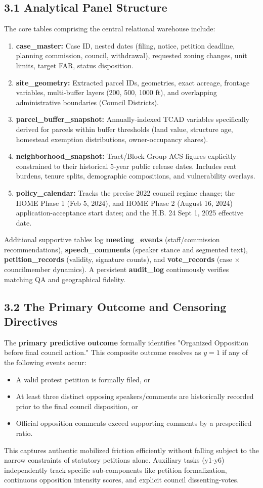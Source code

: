 \subsection*{3.1 Analytical Panel Structure}
The core tables comprising the central relational warehouse include:
\begin{enumerate}
 \item \textbf{case\_master:} Case ID, nested dates (filing, notice, petition deadline, planning commission, council, withdrawal), requested zoning changes, unit limits, target FAR, status disposition.
 \item \textbf{site\_geometry:} Extracted parcel IDs, geometries, exact acreage, frontage variables, multi-buffer layers (200, 500, 1000 ft), and overlapping administrative boundaries (Council Districts).
 \item \textbf{parcel\_buffer\_snapshot:} Annually-indexed TCAD variables specifically derived for parcels within buffer thresholds (land value, structure age, homestead exemption distributions, owner-occupancy shares).
 \item \textbf{neighborhood\_snapshot:} Tract/Block Group ACS figures explicitly constrained to their historical 5-year public release dates. Includes rent burdens, tenure splits, demographic compositions, and vulnerability overlays.
 \item \textbf{policy\_calendar:} Tracks the precise 2022 council regime change; the HOME Phase 1 (Feb 5, 2024), and HOME Phase 2 (August 16, 2024) application-acceptance start dates; and the H.B. 24 Sept 1, 2025 effective date.
\end{enumerate}

Additional supportive tables log \textbf{meeting\_events} (staff/commission recommendations), \textbf{speech\_comments} (speaker stance and segmented text), \textbf{petition\_records} (validity, signature counts), and \textbf{vote\_records} (case × councilmember dynamics). A persistent \textbf{audit\_log} continuously verifies matching QA and geographical fidelity.

\subsection*{3.2 The Primary Outcome and Censoring Directives}
The \textbf{primary predictive outcome} formally identifies "Organized Opposition before final council action." This composite outcome resolves as $y=1$ if any of the following events occur:
\begin{itemize}
 \item A valid protest petition is formally filed, or
 \item At least three distinct opposing speakers/comments are historically recorded prior to the final council disposition, or
 \item Official opposition comments exceed supporting comments by a prespecified ratio.
\end{itemize}
This captures authentic mobilized friction efficiently without falling subject to the narrow constraints of statutory petitions alone. Auxiliary tasks (y1-y6) independently track specific sub-components like petition formalization, continuous opposition intensity scores, and explicit council dissenting-votes. 

